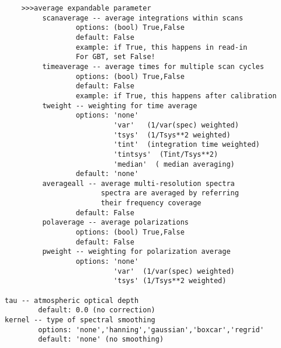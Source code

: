 \begin{verbatim}
    >>>average expandable parameter
         scanaverage -- average integrations within scans
                 options: (bool) True,False
                 default: False
                 example: if True, this happens in read-in
                 For GBT, set False!
         timeaverage -- average times for multiple scan cycles
                 options: (bool) True,False
                 default: False
                 example: if True, this happens after calibration
         tweight -- weighting for time average
                 options: 'none'
                          'var'   (1/var(spec) weighted)
                          'tsys'  (1/Tsys**2 weighted)
                          'tint'  (integration time weighted)
                          'tintsys'  (Tint/Tsys**2)
                          'median'  ( median averaging)
                 default: 'none'
         averageall -- average multi-resolution spectra
                       spectra are averaged by referring 
                       their frequency coverage
                 default: False
         polaverage -- average polarizations
                 options: (bool) True,False
                 default: False
         pweight -- weighting for polarization average
                 options: 'none'
                          'var'  (1/var(spec) weighted)
                          'tsys' (1/Tsys**2 weighted)

tau -- atmospheric optical depth
        default: 0.0 (no correction)
kernel -- type of spectral smoothing
        options: 'none','hanning','gaussian','boxcar','regrid'
        default: 'none' (no smoothing)


\end{verbatim}
